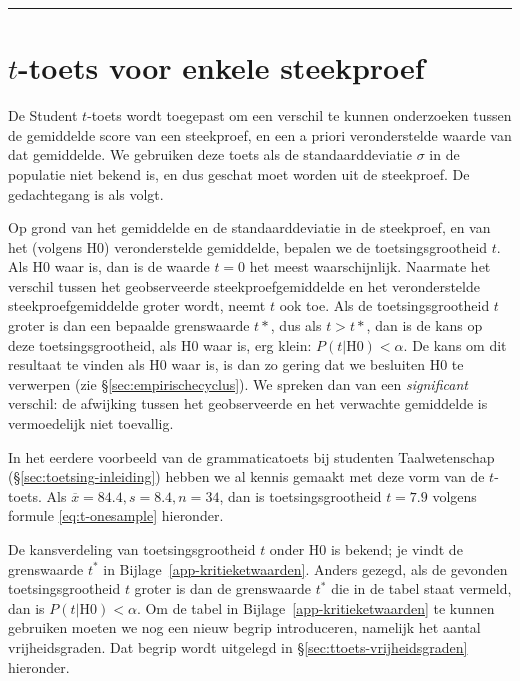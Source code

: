 \documentclass[
]{book}
\begin{document}
\begin{center}\rule{0.5\linewidth}{0.5pt}\end{center}

\section{\texorpdfstring{\(t\)-toets voor enkele steekproef}{t-toets voor enkele steekproef}}\label{sec:ttoets-onesample}

De Student \(t\)-toets wordt toegepast om een verschil te kunnen
onderzoeken tussen de gemiddelde score van een steekproef, en een a
priori veronderstelde waarde van dat gemiddelde. We gebruiken deze toets
als de standaarddeviatie \(\sigma\) in de populatie niet bekend is, en dus
geschat moet worden uit de steekproef. De gedachtegang is als volgt.

Op grond van het gemiddelde en de standaarddeviatie in de steekproef, en
van het (volgens H0) veronderstelde gemiddelde, bepalen we de
toetsingsgrootheid \(t\). Als H0 waar is, dan is de waarde \(t=0\) het meest
waarschijnlijk. Naarmate het verschil tussen het geobserveerde
steekproefgemiddelde en het veronderstelde steekproefgemiddelde groter
wordt, neemt \(t\) ook toe. Als de toetsingsgrootheid \(t\) groter is dan
een bepaalde grenswaarde \(t*\), dus als \(t>t*\), dan is de kans op deze
toetsingsgrootheid, als H0 waar is, erg klein:
\(P(t|\textrm{H0}) < \alpha\). De kans om dit resultaat te vinden als H0
waar is, is dan zo gering dat we besluiten H0 te verwerpen (zie
§\ref{sec:empirischecyclus}). We spreken dan van een \emph{significant}
verschil: de afwijking tussen het geobserveerde en het verwachte
gemiddelde is vermoedelijk niet toevallig.

In het eerdere voorbeeld van de grammaticatoets bij studenten
Taalwetenschap (§\ref{sec:toetsing-inleiding}) hebben we al kennis
gemaakt met deze vorm van de \(t\)-toets. Als
\(\overline{x}=84.4, s=8.4, n=34\), dan is toetsingsgrootheid \(t=7.9\)
volgens formule \eqref{eq:t-onesample} hieronder.

De kansverdeling van toetsingsgrootheid \(t\) onder H0 is bekend; je vindt
de grenswaarde \(t^*\) in Bijlage~\ref{app-kritieketwaarden}. Anders
gezegd, als de gevonden toetsingsgrootheid \(t\) groter is dan de
grenswaarde \(t^*\) die in de tabel staat vermeld, dan is
\(P(t|\textrm{H0})<\alpha\). Om de tabel in
Bijlage~\ref{app-kritieketwaarden} te kunnen gebruiken moeten we nog
een nieuw begrip introduceren, namelijk het aantal vrijheidsgraden. Dat
begrip wordt uitgelegd in §\ref{sec:ttoets-vrijheidsgraden} hieronder.
\end{document}
